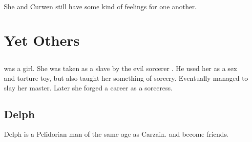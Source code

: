 She and Curwen still have some kind of feelings for one another. 












































\chapter{Yet Others}















\section[Cyri]{\Cyri}
\index{\Cyri}
\Cyri was a \human girl.
She was taken as a slave by the evil sorcerer .
He used her as a sex and torture toy, but also taught her something of sorcery.
Eventually \Cyri managed to slay her master.
Later she forged a career as a sorceress. 















\section{Delph}
Delph is a Pelidorian \human{} man of the same age as Carzain.  and become friends. 

